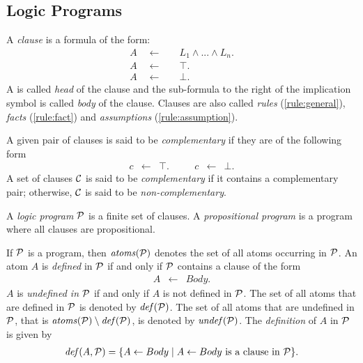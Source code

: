 \subsection{Logic Programs}
\label{sec:preliminaries:lp}

\begin{definition}
\label{def:clause}
\normalfont A \textit{clause} is a formula of the form:
\begin{align}
\label{rule:general} A \quad\leftarrow&\quad L_1 \wedge ... \wedge L_n.\\
\label{rule:fact} A \quad\leftarrow&\quad \top.\\
\label{rule:assumption} A \quad\leftarrow&\quad \bot.
\end{align}
A is called \textit{head} of the clause and the sub-formula to the right of the implication symbol is called \textit{body} of the clause. Clauses are also called \textit{rules} (\ref{rule:general}), \textit{facts} (\ref{rule:fact}) and \textit{assumptions} (\ref{rule:assumption}).

A given pair of clauses is said to be \textit{complementary} if they are of the following form
\[
\begin{array}{ccccccc}
c &\leftarrow& \top. &\quad& c &\leftarrow& \bot. 
\end{array}
\]
A set of clauses $\mathcal{C}$ is said to be \textit{complementary} if it contains a complementary pair; otherwise, $\mathcal{C}$ is said to be \textit{non-complementary}.
\end{definition}

\begin{definition}
\label{def:program}
\normalfont 
A \textit{logic program} $\mathcal{P}$ is a finite set of clauses. A \textit{propositional program} is a program where all clauses are propositional.
 
If $\mathcal{P}$ is a program, then $\mathit{atoms}(\mathcal{P})$ denotes the set of all atoms occurring in $\mathcal{P}$. An atom $A$ is \textit{defined} in $\mathcal{P}$ if and only if $\mathcal{P}$ contains a clause of the form
\[
\begin{array}{lcl}
A &\leftarrow &Body. 
\end{array}
\]
$A$ is \textit{undefined in $\mathcal{P}$} if and only if $A$ is not defined in $\mathcal{P}$. The set of all atoms that are defined in $\mathcal{P}$ is denoted by $\mathit{def}(\mathcal{P})$. The set of all atoms that are undefined in $\mathcal{P}$, that is $\mathit{atoms}(\mathcal{P}) \setminus \mathit{def}(\mathcal{P})$, is denoted by $\mathit{undef}(\mathcal{P})$. The \textit{definition} of $A$ in $\mathcal{P}$ is given by
\[
\begin{array}{c}
\mathit{def}(A, \mathcal{P}) =  \{ A \leftarrow Body \mid  A \leftarrow Body \mbox{ is a clause in } \mathcal{P}\}.
\end{array}
\]
\end{definition}

